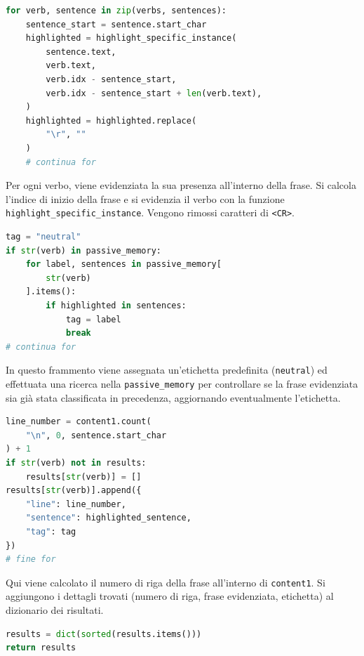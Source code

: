 \documentclass[12pt]{report}
\begin{document}
\begin{mdframed}
\small
\begin{lstlisting}[language=Python]
for verb, sentence in zip(verbs, sentences):
    sentence_start = sentence.start_char
    highlighted = highlight_specific_instance(
        sentence.text,
        verb.text,
        verb.idx - sentence_start,
        verb.idx - sentence_start + len(verb.text),
    )
    highlighted = highlighted.replace(
        "\r", ""
    )
    # continua for
\end{lstlisting}
\end{mdframed}

\noindent Per ogni verbo, viene evidenziata la sua presenza all'interno della frase. Si calcola l'indice di inizio della frase e si evidenzia il verbo con la funzione \texttt{highlight\_specific\_instance}. Vengono rimossi caratteri di \texttt{<CR>}.


\begin{mdframed}
\small
\begin{lstlisting}[language=Python]
tag = "neutral"
if str(verb) in passive_memory:
    for label, sentences in passive_memory[
        str(verb)
    ].items():
        if highlighted in sentences:
            tag = label
            break
# continua for
\end{lstlisting}
\end{mdframed}

\noindent In questo frammento viene assegnata un'etichetta predefinita (\texttt{neutral}) ed effettuata una ricerca nella \texttt{passive\_memory} per controllare se la frase evidenziata sia già stata classificata in precedenza, aggiornando eventualmente l'etichetta.


\begin{mdframed}
\small
\begin{lstlisting}[language=Python]
line_number = content1.count(
    "\n", 0, sentence.start_char
) + 1
if str(verb) not in results:
    results[str(verb)] = []
results[str(verb)].append({
    "line": line_number,
    "sentence": highlighted_sentence,
    "tag": tag
})
# fine for
\end{lstlisting}
\end{mdframed}

\noindent Qui viene calcolato il numero di riga della frase all'interno di \texttt{content1}. Si aggiungono i dettagli trovati (numero di riga, frase evidenziata, etichetta) al dizionario dei risultati.


\begin{mdframed}
\small
\begin{lstlisting}[language=Python]
results = dict(sorted(results.items()))
return results
\end{lstlisting}
\end{mdframed}
\end{document}
